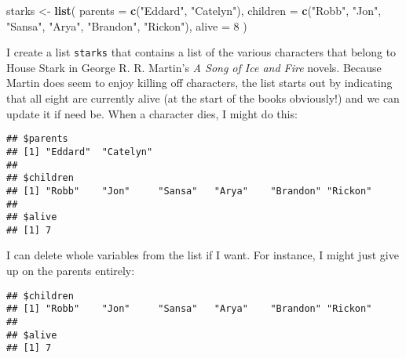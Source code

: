 \documentclass[]{book}
\newenvironment{Shaded}{\begin{snugshade}}{\end{snugshade}}
\newcommand{\DataTypeTok}[1]{\textcolor[rgb]{0.13,0.29,0.53}{#1}}
\newcommand{\DecValTok}[1]{\textcolor[rgb]{0.00,0.00,0.81}{#1}}
\newcommand{\KeywordTok}[1]{\textcolor[rgb]{0.13,0.29,0.53}{\textbf{#1}}}
\newcommand{\NormalTok}[1]{#1}
\newcommand{\OperatorTok}[1]{\textcolor[rgb]{0.81,0.36,0.00}{\textbf{#1}}}
\newcommand{\OtherTok}[1]{\textcolor[rgb]{0.56,0.35,0.01}{#1}}
\newcommand{\StringTok}[1]{\textcolor[rgb]{0.31,0.60,0.02}{#1}}
\begin{document}
\begin{Shaded}
\begin{Highlighting}[]
\NormalTok{starks <-}\StringTok{ }\KeywordTok{list}\NormalTok{(}
  \DataTypeTok{parents =} \KeywordTok{c}\NormalTok{(}\StringTok{"Eddard"}\NormalTok{, }\StringTok{"Catelyn"}\NormalTok{),}
  \DataTypeTok{children =} \KeywordTok{c}\NormalTok{(}\StringTok{"Robb"}\NormalTok{, }\StringTok{"Jon"}\NormalTok{, }\StringTok{"Sansa"}\NormalTok{, }\StringTok{"Arya"}\NormalTok{, }\StringTok{"Brandon"}\NormalTok{, }\StringTok{"Rickon"}\NormalTok{),}
  \DataTypeTok{alive =} \DecValTok{8}
\NormalTok{)}
\end{Highlighting}
\end{Shaded}

I create a list \texttt{starks} that contains a list of the various characters that belong to House Stark in George R. R. Martin's \emph{A Song of Ice and Fire} novels. Because Martin does seem to enjoy killing off characters, the list starts out by indicating that all eight are currently alive (at the start of the books obviously!) and we can update it if need be. When a character dies, I might do this:

\begin{Shaded}
\end{Shaded}

\begin{verbatim}
## $parents
## [1] "Eddard"  "Catelyn"
## 
## $children
## [1] "Robb"    "Jon"     "Sansa"   "Arya"    "Brandon" "Rickon" 
## 
## $alive
## [1] 7
\end{verbatim}

I can delete whole variables from the list if I want. For instance, I might just give up on the parents entirely:

\begin{Shaded}
\end{Shaded}

\begin{verbatim}
## $children
## [1] "Robb"    "Jon"     "Sansa"   "Arya"    "Brandon" "Rickon" 
## 
## $alive
## [1] 7
\end{verbatim}
\end{document}
